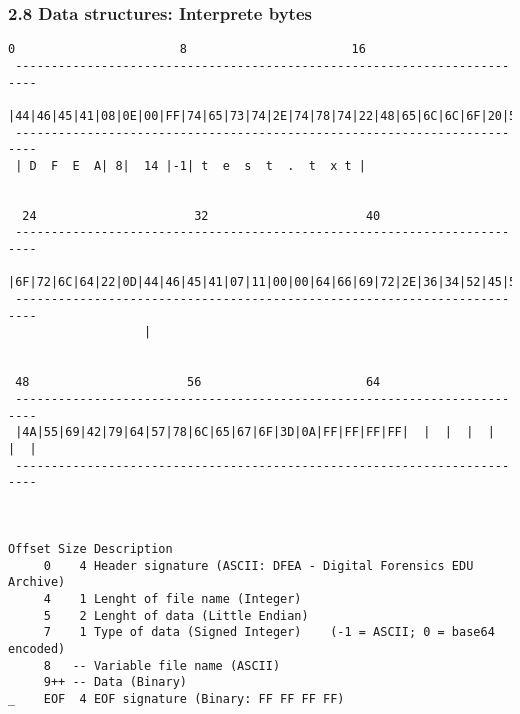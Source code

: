 \begin{frame}[fragile]
  \frametitle{2.8 Data structures: Interprete bytes}
\begin{lstlisting}[basicstyle=\tiny]
  0                       8                       16                      
 ------------------------------------------------------------------------- 
 |44|46|45|41|08|0E|00|FF|74|65|73|74|2E|74|78|74|22|48|65|6C|6C|6F|20|57|
 -------------------------------------------------------------------------
 | D  F  E  A| 8|  14 |-1| t  e  s  t  .  t  x t |                      


  24                      32                      40
 -------------------------------------------------------------------------
 |6F|72|6C|64|22|0D|44|46|45|41|07|11|00|00|64|66|69|72|2E|36|34|52|45|5A|
 -------------------------------------------------------------------------
                   |


 48                      56                       64
 -------------------------------------------------------------------------
 |4A|55|69|42|79|64|57|78|6C|65|67|6F|3D|0A|FF|FF|FF|FF|  |  |  |  |  |  |
 -------------------------------------------------------------------------



Offset Size Description
     0    4 Header signature (ASCII: DFEA - Digital Forensics EDU Archive)
     4    1 Lenght of file name (Integer)
     5    2 Lenght of data (Little Endian)
     7    1 Type of data (Signed Integer)    (-1 = ASCII; 0 = base64 encoded)
     8   -- Variable file name (ASCII)
     9++ -- Data (Binary)
_    EOF  4 EOF signature (Binary: FF FF FF FF)
\end{lstlisting}
\end{frame}


